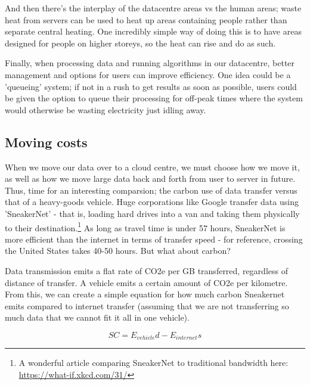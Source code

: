\documentclass{article}
\begin{document}
And then there's the interplay of the datacentre areas vs the human areas; waste heat from servers can be used to heat up areas containing people rather than separate central heating. One incredibly simple way of doing this is to have areas designed for people on higher storeys, so the heat can rise and do as such. \newline

Finally, when processing data and running algorithms in our datacentre, better management and options for users can improve efficiency. One idea could be a 'queueing' system; if not in a rush to get results as soon as possible, users could be given the option to queue their processing for off-peak times where the system would otherwise be wasting electricity just idling away.


\subsection{Moving costs}
When we move our data over to a cloud centre, we must choose how we move it, as well as how we move large data back and forth from user to server in future. Thus, time for an interesting comparsion; the carbon use of data transfer versus that of a heavy-goods vehicle. Huge corporations like Google transfer data using 'SneakerNet' - that is, loading hard drives into a van and taking them physically to their destination.\footnote{A wonderful article comparing SneakerNet to traditional bandwidth here: \href{https://what-if.xkcd.com/31/}{https://what-if.xkcd.com/31/}} As long as travel time is under 57 hours, SneakerNet is more efficient than the internet in terms of transfer speed \citep{jaya2020sneakernet} - for reference, crossing the United States takes 40-50 hours. But what about carbon? \newline

Data transmission emits a flat rate of CO2e per GB transferred, regardless of distance of transfer. A vehicle emits a certain amount of CO2e per kilometre. From this, we can create a simple equation for how much carbon Sneakernet emits compared to internet transfer (assuming that we are not transferring so much data that we cannot fit it all in one vehicle).

$$SC = E_{vehicle}d - E_{internet}s$$
\end{document}
